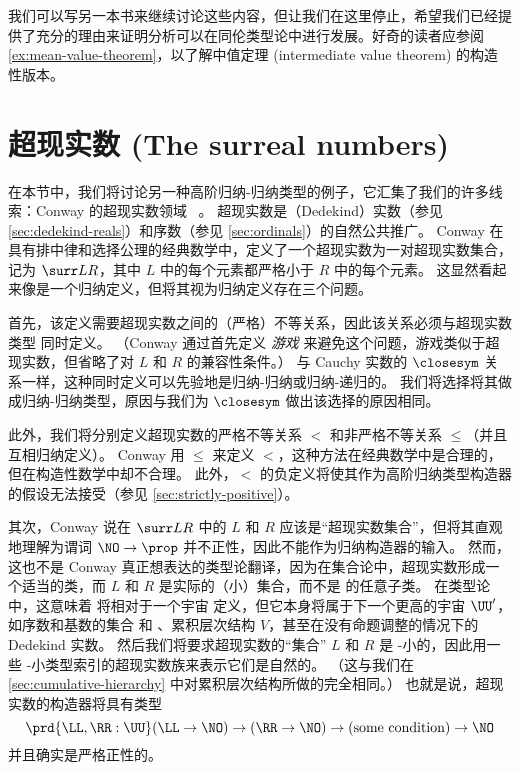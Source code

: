 我们可以写另一本书来继续讨论这些内容，但让我们在这里停止，希望我们已经提供了充分的理由来证明分析可以在同伦类型论中进行发展。好奇的读者应参阅 \cref{ex:mean-value-theorem}，以了解中值定理 (intermediate value theorem) 的构造性版本。


%
%

\section{超现实数 (The surreal numbers)}
\label{sec:surreals}

%

在本节中，我们将讨论另一种高阶归纳-归纳类型的例子，它汇集了我们的许多线索：Conway 的超现实数领域 \NO~\cite{conway:onag}。
超现实数是（Dedekind）实数（参见 \cref{sec:dedekind-reals}）和序数（参见 \cref{sec:ordinals}）的自然公共推广。
Conway 在具有排中律和选择公理的经典数学中，定义了一个超现实数为一对超现实数集合，记为 $\surr L R$，其中 $L$ 中的每个元素都严格小于 $R$ 中的每个元素。
这显然看起来像是一个归纳定义，但将其视为归纳定义存在三个问题。

首先，该定义需要超现实数之间的（严格）不等关系，因此该关系必须与超现实数类型 \NO 同时定义。
（Conway 通过首先定义 \emph{游戏} 来避免这个问题，游戏类似于超现实数，但省略了对 $L$ 和 $R$ 的兼容性条件。）
与 Cauchy 实数的 $\closesym$ 关系一样，这种同时定义可以先验地是归纳-归纳或归纳-递归的。
我们将选择将其做成归纳-归纳类型，原因与我们为 $\closesym$ 做出该选择的原因相同。

此外，我们将分别定义超现实数的严格不等关系 $<$ 和非严格不等关系 $\le$（并且互相归纳定义）。
Conway 用 $\le$ 来定义 $<$，这种方法在经典数学中是合理的，但在构造性数学中却不合理。
%
此外，$<$ 的负定义将使其作为高阶归纳类型构造器的假设无法接受（参见 \cref{sec:strictly-positive}）。

其次，Conway 说在 $\surr L R$ 中的 $L$ 和 $R$ 应该是“超现实数集合”，但将其直观地理解为谓词 $\NO\to\prop$ 并不正性，因此不能作为归纳构造器的输入。
然而，这也不是 Conway 真正想表达的类型论翻译，因为在集合论中，超现实数形成一个适当的类，而 $L$ 和 $R$ 是实际的（小）集合，而不是 \NO 的任意子类。
在类型论中，这意味着 \NO 将相对于一个宇宙 \UU 定义，但它本身将属于下一个更高的宇宙 $\UU'$，如序数和基数的集合 \ord 和 \card、累积层次结构 $V$，甚至在没有命题调整的情况下的 Dedekind 实数。
%
然后我们将要求超现实数的“集合” $L$ 和 $R$ 是 \UU-小的，因此用一些 \UU-小类型索引的超现实数族来表示它们是自然的。
（这与我们在 \cref{sec:cumulative-hierarchy} 中对累积层次结构所做的完全相同。）
也就是说，超现实数的构造器将具有类型
\[ \prd{\LL,\RR:\UU} (\LL\to\NO) \to (\RR\to \NO) \to (\text{some condition}) \to \NO \]
并且确实是严格正性的。

